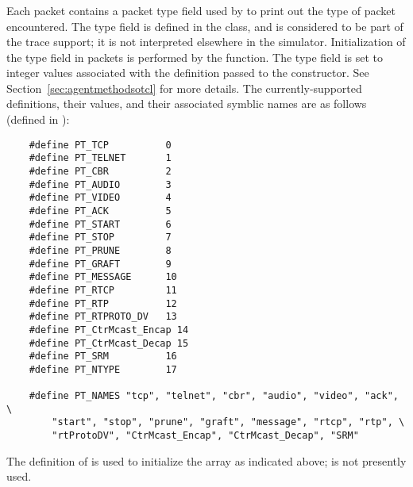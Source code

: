 \subsubsection{}

Each packet contains a packet type field used by 
to print out the type of packet encountered.
The type field is defined in the  class, and is considered
to be part of the trace support; it is not interpreted
elsewhere in the simulator.
Initialization of the type field in packets is performed by the
 function.
The type field is set to integer values associated with the
definition passed to the  constructor.
See Section~\ref{sec:agentmethodsotcl} for more details.
The currently-supported definitions, their values, and their
associated symblic names are as follows
(defined in ):
\begin{small}
\begin{verbatim}
	#define PT_TCP          0
	#define PT_TELNET       1
	#define PT_CBR          2
	#define PT_AUDIO        3
	#define PT_VIDEO        4
	#define PT_ACK          5
	#define PT_START        6
	#define PT_STOP         7
	#define PT_PRUNE        8
	#define PT_GRAFT        9
	#define PT_MESSAGE      10
	#define PT_RTCP         11
	#define PT_RTP          12
	#define PT_RTPROTO_DV   13
	#define PT_CtrMcast_Encap 14
	#define PT_CtrMcast_Decap 15
	#define PT_SRM          16
	#define PT_NTYPE        17

	#define PT_NAMES "tcp", "telnet", "cbr", "audio", "video", "ack", \
		"start", "stop", "prune", "graft", "message", "rtcp", "rtp", \
		"rtProtoDV", "CtrMcast_Encap", "CtrMcast_Decap", "SRM"

\end{verbatim}
\end{small}
The definition of  is used to initialize the
 array as indicated above;
\code{PT\_NTYPE} is not presently used.

\subsubsection{}

